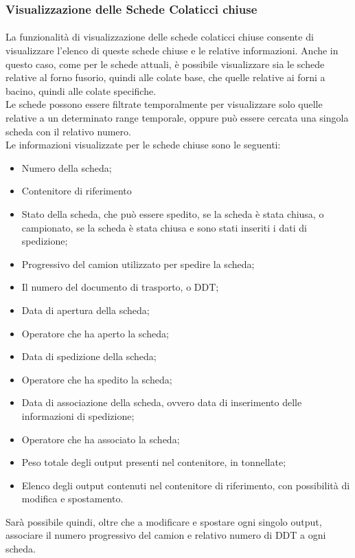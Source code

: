   \subsubsection{Visualizzazione delle Schede Colaticci chiuse}
  \paragraph{}
  La funzionalità di visualizzazione delle schede colaticci chiuse consente di visualizzare l’elenco 
  di queste schede chiuse e le relative informazioni. Anche in questo caso, come per le schede 
  attuali, è possibile visualizzare sia le schede relative al forno fusorio, quindi alle colate base, 
  che quelle relative ai forni a bacino, quindi alle colate specifiche.\\
  Le schede possono essere filtrate temporalmente per visualizzare solo quelle relative 
  a un determinato range temporale, oppure può essere cercata una singola scheda con il relativo numero.\\
  Le informazioni visualizzate per le schede chiuse sono le seguenti:
  \begin{itemize}
    \item Numero della scheda;
    \item Contenitore di riferimento
    \item Stato della scheda, che può essere spedito, se la scheda è stata chiusa, o campionato, 
    se la scheda è stata chiusa e sono stati inseriti i dati di spedizione;
    \item Progressivo del camion utilizzato per spedire la scheda;
    \item Il numero del documento di trasporto, o DDT;
    \item Data di apertura della scheda;
    \item Operatore che ha aperto la scheda;
    \item Data di spedizione della scheda;
    \item Operatore che ha spedito la scheda;
    \item Data di associazione della scheda, ovvero data di inserimento delle informazioni di spedizione;
    \item Operatore che ha associato la scheda;
    \item Peso totale degli output presenti nel contenitore, in tonnellate;
    \item Elenco degli output contenuti nel contenitore di riferimento, con possibilità di modifica e 
    spostamento.    
  \end{itemize}
  Sarà possibile quindi, oltre che a modificare e spostare ogni singolo output, associare il numero 
  progressivo del camion e relativo numero di DDT a ogni scheda.  
  
